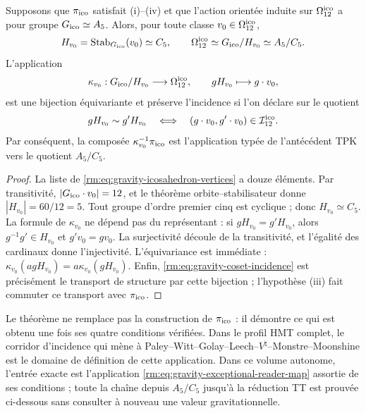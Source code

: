 \begin{theorem}
\label{rm:thm:gravity-exceptional-descent}
Supposons que \(\pi_{\rm ico}\) satisfait (i)--(iv) et que l’action
orientée induite sur \(\Omega_{12}^{\rm ico}\) a pour groupe
\(G_{\rm ico}\simeq A_5\). Alors, pour toute classe
\(v_0\in\Omega_{12}^{\rm ico}\),
\begin{equation}
\label{rm:eq:gravity-icosahedral-quotient}
H_{v_0}=\operatorname{Stab}_{G_{\rm ico}}(v_0)\simeq C_5,
\qquad
\Omega_{12}^{\rm ico}\simeq G_{\rm ico}/H_{v_0}\simeq A_5/C_5.
\end{equation}
L’application
\begin{equation}
\label{rm:eq:gravity-coset-map}
\kappa_{v_0}:G_{\rm ico}/H_{v_0}\longrightarrow\Omega_{12}^{\rm ico},
\qquad gH_{v_0}\longmapsto g\cdot v_0,
\end{equation}
est une bijection équivariante et préserve l’incidence si l’on déclare sur le quotient
\begin{equation}
\label{rm:eq:gravity-coset-incidence}
gH_{v_0}\sim g'H_{v_0}
\quad\Longleftrightarrow\quad
(g\cdot v_0,g'\cdot v_0)\in\mathcal I_{12}^{\rm ico}.
\end{equation}
Par conséquent, la composée \(\kappa_{v_0}^{-1}\pi_{\rm ico}\) est l’application
typée de l’antécédent TPK vers le quotient \(A_5/C_5\).
\end{theorem}

\begin{proof}
La liste de \cref{rm:eq:gravity-icosahedron-vertices} a douze éléments.
Par transitivité, \(|G_{\rm ico}\cdot v_0|=12\), et le théorème
orbite--stabilisateur donne \(|H_{v_0}|=60/12=5\). Tout groupe d’ordre
premier cinq est cyclique ; donc \(H_{v_0}\simeq C_5\). La formule de
\(\kappa_{v_0}\) ne dépend pas du représentant : si
\(gH_{v_0}=g'H_{v_0}\), alors \(g^{-1}g'\in H_{v_0}\) et
\(g'v_0=gv_0\). La surjectivité découle de la transitivité, et
l’égalité des cardinaux donne l’injectivité. L’équivariance est immédiate :
\(\kappa_{v_0}(agH_{v_0})=a\kappa_{v_0}(gH_{v_0})\). Enfin,
\cref{rm:eq:gravity-coset-incidence} est précisément le transport de
structure par cette bijection ; l’hypothèse (iii) fait commuter ce
transport avec \(\pi_{\rm ico}\).
\end{proof}

Le théorème ne remplace pas la construction de \(\pi_{\rm ico}\) : il démontre ce qui est obtenu une fois ses quatre conditions vérifiées. Dans le profil HMT complet, le corridor d’incidence qui mène à Paley--Witt--Golay--Leech--\(V^\natural\)--Monstre--Moonshine est le domaine de définition de cette application. Dans ce volume autonome, l’entrée exacte est l’application \cref{rm:eq:gravity-exceptional-reader-map} assortie de ses conditions ; toute la chaîne depuis \(A_5/C_5\) jusqu’à la réduction TT est prouvée ci-dessous sans consulter à nouveau une valeur gravitationnelle.

